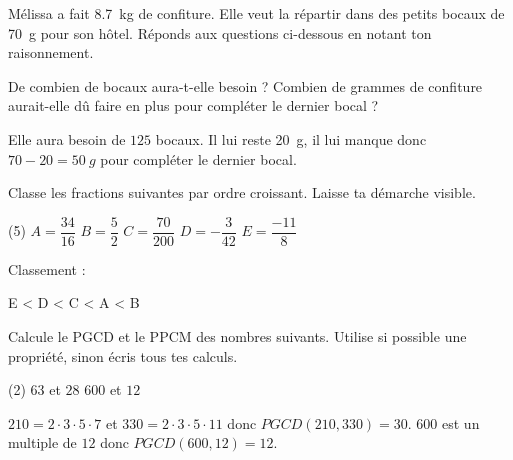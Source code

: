 \documentclass[parskip=half-,twoside=semi, 12pt]{scrartcl}
\begin{document}
\begin{transferer}[points=3]
    Mélissa a fait \SI{8,7}{kg} de confiture. Elle veut la répartir dans des
    petits bocaux de \SI{70}{g} pour son hôtel. Réponds aux questions ci-dessous en notant ton raisonnement.
    \begin{tasks}[after-item-skip=6cm, after-skip=3cm]
        \task De combien de bocaux aura-t-elle besoin ?
        \task Combien de grammes de confiture aurait-elle dû faire en plus pour compléter le dernier bocal ?
    \end{tasks}
\end{transferer}
\begin{soltransferer}
    \begin{tasks}
        \task {}
        \qquad Elle aura besoin de \(125\) bocaux.
        \task Il lui reste \SI{20}{g}, il lui manque donc \(70-20=\SI{50}{g}\) pour  compléter le dernier bocal.
    \end{tasks}
\end{soltransferer}
\begin{appliquer}[points=2]
    Classe les fractions suivantes par ordre croissant. Laisse ta démarche visible.
    \begin{tasks}[label=](5)
        \task \(A=\dfrac{34}{16}\)
        \task \(B=\dfrac{5}{2}\)
        \task \(C=\dfrac{70}{200}\)
        \task \(D=- \dfrac{3}{42}\)
        \task \(E=\dfrac{- 11}{8}\)
    \end{tasks}
    \vspace{1cm}
    Classement :
    \vspace{1cm}
\end{appliquer}
\begin{solappliquer}
    E < D < C < A < B
\end{solappliquer}
\newpage
\begin{appliquer}[points=4]
    Calcule le PGCD et le PPCM des nombres suivants. Utilise si possible une propriété, sinon écris tous tes calculs.
    \begin{tasks}(2)
        \task \(63\) et \(28\)
        \task \(600\) et \(12\)
    \end{tasks}
    \vspace{6cm}
\end{appliquer}
\begin{solappliquer}
    \begin{tasks}
        \task \(210 = 2 \cdot 3 \cdot 5 \cdot 7\) et \(330 = 2 \cdot 3 \cdot 5 \cdot 11\) donc \(PGCD(210, 330) = 30\).
        \task \(600\) est un multiple de \(12\) donc \(PGCD(600,12) = 12\).
    \end{tasks}
    
\end{solappliquer}
\end{document}
